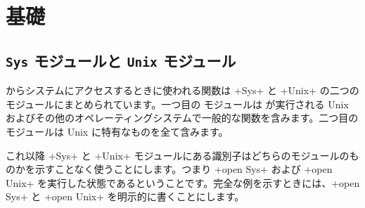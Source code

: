 %
%

\chapter{{基礎}}

\section{{\normalfont\texttt{Sys}} モジュールと {\normalfont\texttt{Unix} モジュール}}

\ocaml からシステムにアクセスするときに使われる関数は \ml+Sys+ と \ml+Unix+ の二つのモジュールにまとめられています。一つ目の  モジュールは \ocaml が実行される Unix およびその他のオペレーティングシステムで一般的な関数を含みます。二つ目の  モジュールは Unix に特有なものを全て含みます。

これ以降 \ml+Sys+ と \ml+Unix+ モジュールにある識別子はどちらのモジュールのものかを示すことなく使うことにします。つまり \ml+open Sys+ および \ml+open Unix+ を実行した状態であるということです。完全な例を示すときには、\ml+open Sys+ と \ml+open Unix+ を明示的に書くことにします。

